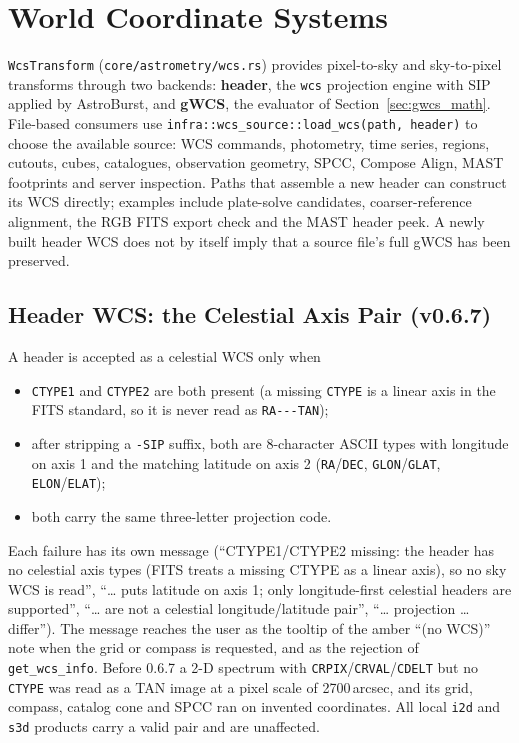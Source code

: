 \documentclass[11pt,a4paper]{article}
\newcommand{\code}[1]{\texttt{\small #1}}
\newcommand{\crate}[1]{\texttt{#1}}
\begin{document}
    \section{World Coordinate Systems}
    \label{sec:wcs}

    \code{WcsTransform} (\code{core/astrometry/wcs.rs}) provides pixel-to-sky and sky-to-pixel transforms through two backends: \textbf{header}, the \crate{wcs} projection engine with SIP applied by AstroBurst, and \textbf{gWCS}, the evaluator of Section~\ref{sec:gwcs_math}. File-based consumers use \code{infra::wcs\_source::load\_wcs(path, header)} to choose the available source: WCS commands, photometry, time series, regions, cutouts, cubes, catalogues, observation geometry, SPCC, Compose Align, MAST footprints and server inspection. Paths that assemble a new header can construct its WCS directly; examples include plate-solve candidates, coarser-reference alignment, the RGB FITS export check and the MAST header peek. A newly built header WCS does not by itself imply that a source file's full gWCS has been preserved.

    \subsection{Header WCS: the Celestial Axis Pair (v0.6.7)}

    A header is accepted as a celestial WCS only when
    \begin{itemize}[nosep]
    \item \code{CTYPE1} and \code{CTYPE2} are both present (a missing \code{CTYPE} is a linear axis in the FITS standard, so it is never read as \code{RA-{}-{}-TAN});
    \item after stripping a \code{-SIP} suffix, both are 8-character ASCII types with longitude on axis 1 and the matching latitude on axis 2 (\code{RA}/\code{DEC}, \code{GLON}/\code{GLAT}, \code{ELON}/\code{ELAT});
    \item both carry the same three-letter projection code.
    \end{itemize}
    Each failure has its own message (``CTYPE1/CTYPE2 missing: the header has no celestial axis types (FITS treats a missing CTYPE as a linear axis), so no sky WCS is read'', ``\ldots{} puts latitude on axis 1; only longitude-first celestial headers are supported'', ``\ldots{} are not a celestial longitude/latitude pair'', ``\ldots{} projection \ldots{} differ''). The message reaches the user as the tooltip of the amber ``(no WCS)'' note when the grid or compass is requested, and as the rejection of \code{get\_wcs\_info}. Before 0.6.7 a 2-D spectrum with \code{CRPIX}/\code{CRVAL}/\code{CDELT} but no \code{CTYPE} was read as a TAN image at a pixel scale of 2700\,arcsec, and its grid, compass, catalog cone and SPCC ran on invented coordinates. All local \code{i2d} and \code{s3d} products carry a valid pair and are unaffected.
\end{document}
